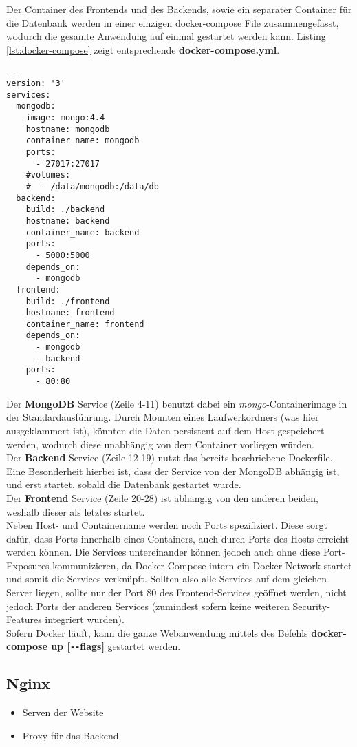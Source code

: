 Der Container des Frontends und des Backends, sowie ein separater Container für die Datenbank werden in einer einzigen docker-compose File zusammengefasst, wodurch die gesamte Anwendung auf einmal gestartet werden kann. Listing \ref{lst:docker-compose} zeigt entsprechende \textbf{docker-compose.yml}.

\begin{lstlisting}[caption={docker-compose},captionpos=b,showstringspaces=false, basicstyle=\small,label={lst:docker-compose}]
---
version: '3'
services:
  mongodb:
    image: mongo:4.4
    hostname: mongodb
    container_name: mongodb
    ports:
      - 27017:27017
    #volumes:
    #  - /data/mongodb:/data/db
  backend:
    build: ./backend
    hostname: backend
    container_name: backend
    ports:
      - 5000:5000
    depends_on: 
      - mongodb
  frontend:
    build: ./frontend
    hostname: frontend
    container_name: frontend
    depends_on:
      - mongodb
      - backend
    ports:
      - 80:80

\end{lstlisting}

Der \textbf{MongoDB} Service (Zeile 4-11) benutzt dabei ein \textit{mongo}-Containerimage in der Standardausführung.
Durch Mounten eines Laufwerkordners (was hier ausgeklammert ist), könnten die Daten persistent auf dem Host gespeichert werden, wodurch diese unabhängig von dem Container vorliegen würden. \\
Der \textbf{Backend} Service (Zeile 12-19) nutzt das bereits beschriebene Dockerfile. Eine Besonderheit hierbei ist, dass der Service von der MongoDB abhängig ist, und erst startet, sobald die Datenbank gestartet wurde.\\
Der \textbf{Frontend} Service (Zeile 20-28) ist abhängig von den anderen beiden, weshalb dieser als letztes startet. \\

Neben Host- und Containername werden noch Ports spezifiziert. 
Diese sorgt dafür, dass Ports innerhalb eines Containers, auch durch Ports des Hosts erreicht werden können. 
Die Services untereinander können jedoch auch ohne diese Port-Exposures kommunizieren, da Docker Compose intern ein Docker Network startet und somit die Services verknüpft.
Sollten also alle Services auf dem gleichen Server liegen, sollte nur der Port 80 des Frontend-Services geöffnet werden, nicht jedoch Ports der anderen Services (zumindest sofern keine weiteren Security-Features integriert wurden).\\

Sofern Docker läuft, kann die ganze Webanwendung mittels des Befehls \textbf{docker-compose up [\texttt{-{}-}flags]} gestartet werden.

\subsection{Nginx}\label{ch:nginx}
\begin{itemize}
\item Serven der Website
\item Proxy für das Backend
\end{itemize}